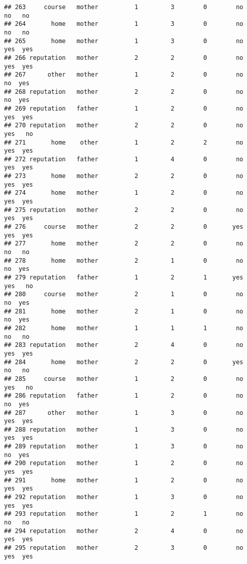 \documentclass[
]{article}
\begin{document}
\begin{verbatim}
## 263     course   mother          1         3        0        no     no   no
## 264       home   mother          1         3        0        no     no   no
## 265       home   mother          1         3        0        no    yes  yes
## 266 reputation   mother          2         2        0        no    yes  yes
## 267      other   mother          1         2        0        no     no  yes
## 268 reputation   mother          2         2        0        no     no  yes
## 269 reputation   father          1         2        0        no    yes  yes
## 270 reputation   mother          2         2        0        no    yes   no
## 271       home    other          1         2        2        no    yes  yes
## 272 reputation   father          1         4        0        no    yes  yes
## 273       home   mother          2         2        0        no    yes  yes
## 274       home   mother          1         2        0        no    yes  yes
## 275 reputation   mother          2         2        0        no    yes  yes
## 276     course   mother          2         2        0       yes    yes  yes
## 277       home   mother          2         2        0        no     no   no
## 278       home   mother          2         1        0        no     no  yes
## 279 reputation   father          1         2        1       yes    yes   no
## 280     course   mother          2         1        0        no     no  yes
## 281       home   mother          2         1        0        no     no  yes
## 282       home   mother          1         1        1        no     no   no
## 283 reputation   mother          2         4        0        no    yes  yes
## 284       home   mother          2         2        0       yes     no   no
## 285     course   mother          1         2        0        no    yes   no
## 286 reputation   father          1         2        0        no     no  yes
## 287      other   mother          1         3        0        no    yes  yes
## 288 reputation   mother          1         3        0        no    yes  yes
## 289 reputation   mother          1         3        0        no     no  yes
## 290 reputation   mother          1         2        0        no    yes  yes
## 291       home   mother          1         2        0        no    yes  yes
## 292 reputation   mother          1         3        0        no    yes  yes
## 293 reputation   mother          1         2        1        no     no   no
## 294 reputation   mother          2         4        0        no    yes  yes
## 295 reputation   mother          2         3        0        no    yes  yes

\end{verbatim}
\end{document}
